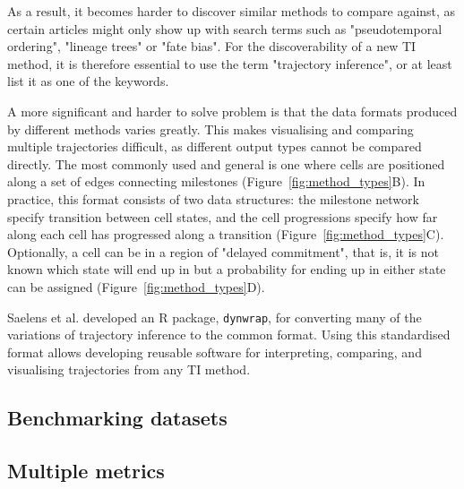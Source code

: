 As a result, it becomes harder to discover similar methods to compare against, as certain articles might only show up with search terms such as "pseudotemporal ordering", "lineage trees" or "fate bias". For the discoverability of a new TI method, it is therefore essential to use the term "trajectory inference", or at least list it as one of the keywords. 

A more significant and harder to solve problem is that the data formats produced by different methods varies greatly. This makes visualising and comparing multiple trajectories difficult, as different output types cannot be compared directly. The most commonly used and general is one where cells are positioned along a set of edges connecting milestones (Figure~\ref{fig:method_types}B). In practice, this format consists of two data structures: the milestone network specify transition between cell states, and the cell progressions specify how far along each cell has progressed along a transition (Figure~\ref{fig:method_types}C). Optionally, a cell can be in a region of "delayed commitment", that is, it is not known which state will end up in but a probability for ending up in either state can be assigned (Figure~\ref{fig:method_types}D). 

Saelens et al. \cite{saelens_comparisonsinglecelltrajectory_2019} developed an R package, \texttt{dynwrap}, for converting many of the variations of trajectory inference to the common format. Using this standardised format allows developing reusable software for interpreting, comparing, and visualising trajectories from any TI method.

\subsection{Benchmarking datasets}

\subsection{Multiple metrics}


